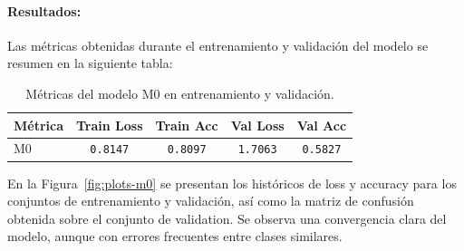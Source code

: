 \documentclass[11pt]{article}
\begin{document}
\paragraph{Resultados:}

Las métricas obtenidas durante el entrenamiento y validación del modelo se resumen en la siguiente tabla:

\begin{table}[H]
    \centering
    \begin{tabular}{lcccc}
        \hline
        Métrica & Train Loss & Train Acc & Val Loss & Val Acc \\
        \hline
        M0 & \texttt{0.8147} & \texttt{0.8097} & \texttt{1.7063} & \texttt{0.5827} \\
        \hline
    \end{tabular}
    \caption{Métricas del modelo M0 en entrenamiento y validación.}
    \label{tab:metrics-m0}
\end{table}

En la Figura~\ref{fig:plots-m0} se presentan los históricos de loss y accuracy para los conjuntos de entrenamiento y validación, así como la matriz de confusión obtenida sobre el conjunto de validation. Se observa una convergencia clara del modelo, aunque con errores frecuentes entre clases similares.
\end{document}
